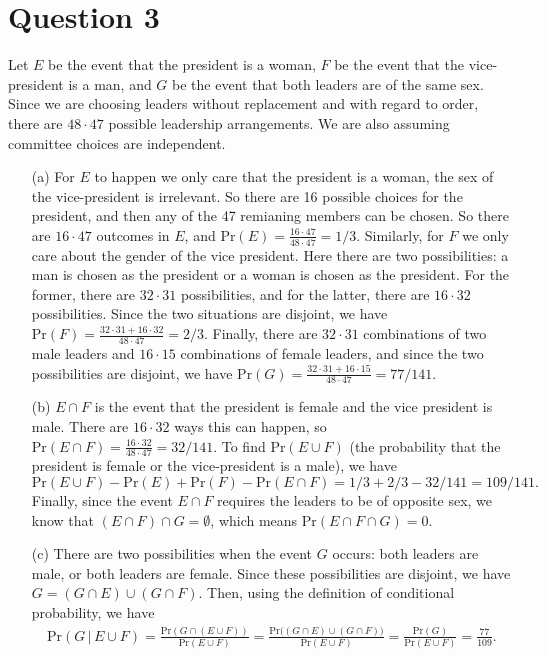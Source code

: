 \documentclass[10pt]{article}
\begin{document}
\section{Question 3} \noindent
Let \(E\) be the event that the president is a woman, \(F\) be the event that the vice-president is a man, and \(G\) be the event that both leaders are of 
the same sex. Since we are choosing leaders without replacement and with regard to order, there are \(48\cdot47\) possible leadership arrangements. We are 
also assuming committee choices are independent. 
\begin{itemize}
    \item[(a)] For \(E\) to happen we only care that the president is a woman, the sex of the vice-president is irrelevant. So there are 16 possible choices 
    for the president, and then any of the 47 remianing members can be chosen. So there are \(16\cdot47\) outcomes in \(E\), and 
    \(\mathrm{Pr}(E) = \frac{16\cdot47}{48\cdot47} = 1/3\). Similarly, for \(F\) we only care about the gender of the vice president. Here there are two
    possibilities: a man is chosen as the president or a woman is chosen as the president. For the former, there are \(32\cdot 31\) possibilities, and for the 
    latter, there are \(16\cdot32\) possibilities. Since the two situations are disjoint, we have \(\mathrm{Pr}(F) = \frac{32\cdot31+16\cdot32}{48\cdot47} 
    = 2/3\). Finally, there are \(32\cdot31\) combinations of two male leaders and \(16\cdot15\) combinations of female leaders, and since the two 
    possibilities are disjoint, we have \(\mathrm{Pr}(G) = \frac{32\cdot31+16\cdot15}{48\cdot47} = 77/141\).
    \item[(b)] \(E\cap F\) is the event that the president is female and the vice president is male. There are \(16\cdot32\) ways this can happen, so 
    \(\mathrm{Pr}(E\cap F) = \frac{16\cdot32}{48\cdot47} = 32/141\). To find \(\mathrm{Pr}(E\cup F)\) (the probability that the president is female or 
    the vice-president is a male), we have \[\mathrm{Pr}(E \cup F) - \mathrm{Pr}(E) + \mathrm{Pr}(F) - \mathrm{Pr}(E\cap F) = 1/3 + 2/3 - 32/141 = 109/141.\]
    Finally, since the event \(E\cap F\) requires the leaders to be of opposite sex, we know that \((E\cap F)\cap G = \emptyset\), which means 
    \(\mathrm{Pr}(E \cap F \cap G) = 0\). 
    \item[(c)] There are two possibilities when the event \(G\) occurs: both leaders are male, or both leaders are female. Since these possibilities are 
    disjoint, we have \(G = (G \cap E) \cup (G \cap F)\). Then, using the definition of conditional probability, we have
    \begin{align*}
        \mathrm{Pr}(G \,|\, E \cup F) = \frac{\mathrm{Pr}(G \cap (E \cup F))}{\mathrm{Pr}(E \cup F)} 
        = \frac{\mathrm{Pr}\big( (G \cap E) \cup (G \cap F) \big)}{\mathrm{Pr}(E \cup F)} 
        = \frac{\mathrm{Pr}(G)}{\mathrm{Pr}(E \cup F)} = \frac{77}{109}.
    \end{align*}
\end{itemize}
\end{document}
